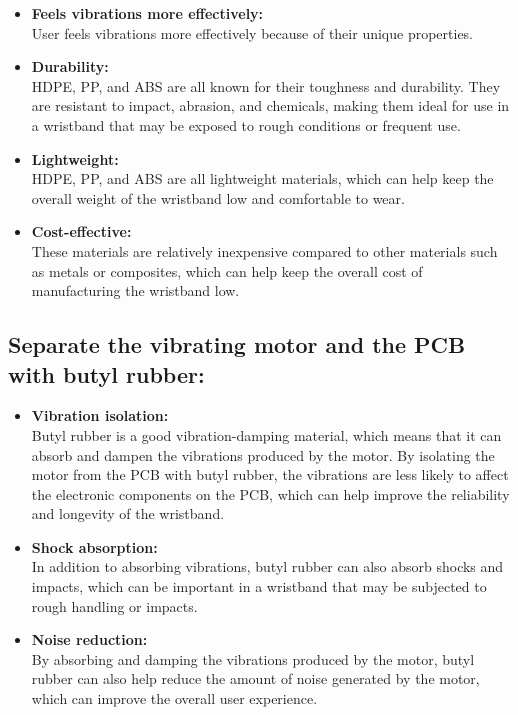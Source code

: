 \documentclass{article}
\begin{document}
        \begin{itemize}
            \item \textbf{Feels vibrations more effectively:}\\
            User feels vibrations more effectively because of their unique properties.

            \item \textbf{Durability:} \\
            HDPE, PP, and ABS are all known for their toughness and durability. They are resistant to impact, abrasion, and chemicals, making them ideal for use in a wristband that may be exposed to rough conditions or frequent use.

            \item \textbf{Lightweight:} \\
            HDPE, PP, and ABS are all lightweight materials, which can help keep the overall weight of the wristband low and comfortable to wear.

            \item \textbf{Cost-effective:} \\
            These materials are relatively inexpensive compared to other materials such as metals or composites, which can help keep the overall cost of manufacturing the wristband low.
        \end{itemize}

        \subsection{Separate the vibrating motor and the PCB with butyl rubber:}

        \begin{itemize}
            \item \textbf{Vibration isolation:} \\
            Butyl rubber is a good vibration-damping material, which means that it can absorb and dampen the vibrations produced by the motor. By isolating the motor from the PCB with butyl rubber, the vibrations are less likely to affect the electronic components on the PCB, which can help improve the reliability and longevity of the wristband.

            \item \textbf{Shock absorption:} \\
            In addition to absorbing vibrations, butyl rubber can also absorb shocks and impacts, which can be important in a wristband that may be subjected to rough handling or impacts.
            
            \item \textbf{Noise reduction:} \\ 
            By absorbing and damping the vibrations produced by the motor, butyl rubber can also help reduce the amount of noise generated by the motor, which can improve the overall user experience.
        \end{itemize}
\end{document}
